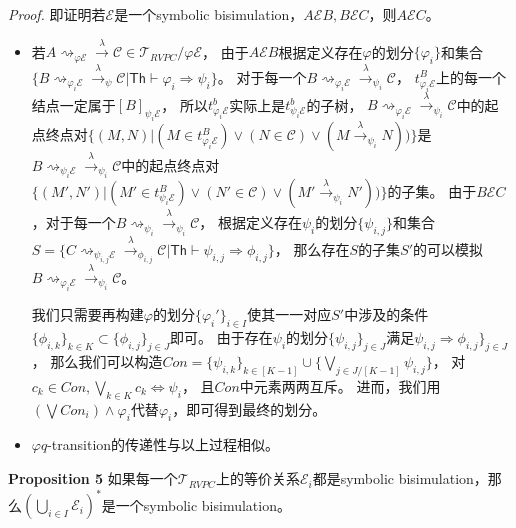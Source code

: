 \textit{Proof.} 即证明若$\mathcal{E}$是一个symbolic bisimulation，$A\mathcal{E}B, B \mathcal{E} C$，则$A \mathcal{E} C$。
\begin{itemize}
   \item {
      若$A\rightsquigarrow_{\varphi \mathcal{E}}\stackrel{\lambda}{\rightarrow} \mathcal{C}\in \mathcal{T}_{RVPC}/\varphi\mathcal{E}$，
      由于$A\mathcal{E}B$根据定义存在$\varphi$的划分$\{\varphi_i\}$和集合$\{B\rightsquigarrow_{\varphi_i\mathcal{E}}\stackrel{\lambda}{\rightarrow}_{\psi}\mathcal{C}|\mathsf{Th}\vdash \varphi_i\Rightarrow\psi_i\}$。
      对于每一个$B\rightsquigarrow_{\varphi_i\mathcal{E}}\stackrel{\lambda}{\rightarrow}_{\psi_i}\mathcal{C}$，
      $t^B_{\varphi_i\mathcal{E}}$上的每一个结点一定属于$[B]_{\psi_i\mathcal{E}}$，
      所以$t^b_{\varphi_i\mathcal{E}}$实际上是$t^b_{\psi_i\mathcal{E}}$的子树，
      $B\rightsquigarrow_{\varphi_i\mathcal{E}}\stackrel{\lambda}{\rightarrow}_{\psi_i}\mathcal{C}$中的起点终点对$\{(M,N)|(M\in t^B_{\varphi_i\mathcal{E}})\vee(N\in \mathcal{C}) \vee (M\stackrel{\lambda}{\rightarrow}_{\psi_i}N))\}$是
      $B\rightsquigarrow_{\psi_i\mathcal{E}}\stackrel{\lambda}{\rightarrow}_{\psi_i}\mathcal{C}$中的起点终点对$\{(M',N')|(M'\in t^B_{\psi_i\mathcal{E}})\vee(N'\in \mathcal{C}) \vee (M'\stackrel{\lambda}{\rightarrow}_{\psi_i}N'))\}$的子集。
      由于$B\mathcal{E}C$，对于每一个$B\rightsquigarrow_{\psi_i}\stackrel{\lambda}{\rightarrow}_{\psi_i}\mathcal{C}$，
      根据定义存在$\psi_i$的划分$\{\psi_{i,j}\}$和集合$S=\{C\rightsquigarrow_{\psi_{i,j}\mathcal{E}}\stackrel{\lambda}{\rightarrow}_{\phi_{i,j}}\mathcal{C}|\mathsf{Th}\vdash \psi_{i,j}\Rightarrow \phi_{i,j}\}$，
      那么存在$S$的子集$S'$的可以模拟$B\rightsquigarrow_{\varphi_i\mathcal{E}}\stackrel{\lambda}{\rightarrow}_{\psi_i}\mathcal{C}$。

      我们只需要再构建$\varphi$的划分$\{\varphi_i'\}_{i\in I}$使其一一对应$S'$中涉及的条件$\{\phi_{i,k}\}_{k\in K}\subset\{\phi_{i,j}\}_{j\in J}$即可。
      由于存在$\psi_i$的划分$\{\psi_{i,j}\}_{j\in J}$满足$\psi_{i,j}\Rightarrow \phi_{i,j}\}_{j\in J}$，
      那么我们可以构造$Con=\{\psi_{i,k}\}_{k\in [K-1]}\cup\{\bigvee_{j\in J/[K-1]}\psi_{i,j}\}$，
      对$c_k\in Con, \bigvee_{k\in K}c_k \Leftrightarrow \psi_i$， 且$Con$中元素两两互斥。
      进而，我们用$(\bigvee Con_i)\wedge \varphi_i$代替$\varphi_i$，即可得到最终的划分。
   }
   \item {
      $\varphi q$-transition的传递性与以上过程相似。
   }
\end{itemize}

\textbf{Proposition 5} 如果每一个$\mathcal{T}_{RVPC}$上的等价关系$\mathcal{E}_i$都是symbolic bisimulation，那么$(\bigcup_{i\in I}\mathcal{E}_i)^*$是一个symbolic bisimulation。

